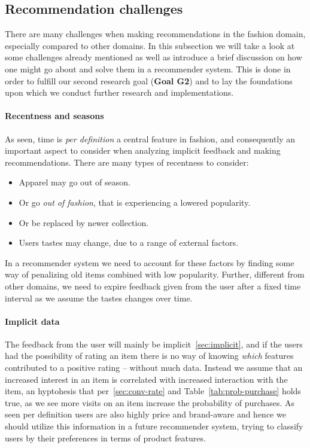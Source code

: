 \subsection{Recommendation challenges}
\label{subsec:rec-challenges}

There are many challenges when making recommendations in the fashion domain,
especially compared to other domains. In this subsection we will take a look at
some challenges already mentioned as well as introduce a brief discussion on
how one might go about and solve them in a recommender system.  This is done in
order to fulfill our second research goal (\textbf{Goal G2}) and to lay the
foundations upon which we conduct further research and implementations.

\paragraph{Recentness and seasons}
As seen, time is \textit{per definition} a central feature in fashion, and
consequently an important aspect to consider when analyzing implicit feedback
and making recommendations. There are many types of recentness to consider:

\begin{itemize}
\item Apparel may go out of season.
\item Or go \textit{out of fashion}, that is experiencing a lowered popularity.
\item Or be replaced by newer collection.
\item Users tastes may change, due to a range of external factors.
\end{itemize}

In a recommender system we need to account for these factors by finding some
way of penalizing old items combined with low popularity. Further, different
from other domains, we need to expire feedback given from the user after a
fixed time interval as we assume the tastes changes over time.

\paragraph{Implicit data} 
The feedback from the user will mainly be implicit~\ref{sec:implicit}, and if
the users had the possibility of rating an item there is no way of knowing
\textit{which} features contributed to a positive rating – without much data.
Instead we assume that an increased interest in an item is correlated with
increased interaction with the item, an hyptohesis that per~\ref{sec:conv-rate}
and Table~\ref{tab:prob-purchase} holds true, as we see more visits on an item
increase the probability of purchases. As seen per definition users are also
highly price and brand-aware and hence we should utilize this information in a
future recommender system, trying to classify users by their preferences in
terms of product features.

